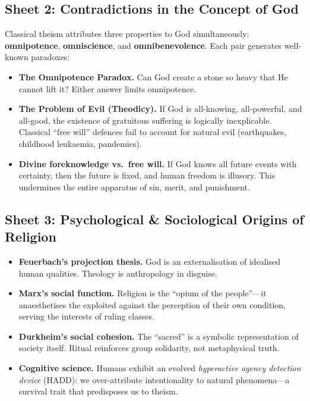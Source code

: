 \subsection{Sheet 2: Contradictions in the Concept of God}

Classical theism attributes three properties to God simultaneously:
\textbf{omnipotence}, \textbf{omniscience}, and \textbf{omnibenevolence}.
Each pair generates well-known paradoxes:

\begin{itemize}
  \item \textbf{The Omnipotence Paradox.}
    Can God create a stone so heavy that He cannot lift it?  Either answer
    limits omnipotence.
  \item \textbf{The Problem of Evil (Theodicy).}
    If God is all-knowing, all-powerful, and all-good, the existence of
    gratuitous suffering is logically inexplicable.  Classical ``free will''
    defences fail to account for natural evil
    (earthquakes, childhood leukaemia, pandemics).
  \item \textbf{Divine foreknowledge vs.\ free will.}
    If God knows all future events with certainty, then the future is fixed,
    and human freedom is illusory.  This undermines the entire apparatus of
    sin, merit, and punishment.
\end{itemize}

\subsection{Sheet 3: Psychological \& Sociological Origins of Religion}

\begin{itemize}
  \item \textbf{Feuerbach's projection thesis.}
    God is an externalisation of idealised human qualities.  Theology is
    anthropology in disguise.
  \item \textbf{Marx's social function.}
    Religion is the ``opium of the people''---it
    anaesthetises the exploited against the perception of their own condition,
    serving the interests of ruling classes.
  \item \textbf{Durkheim's social cohesion.}
    The ``sacred'' is a symbolic representation of society itself.  Ritual
    reinforces group solidarity, not metaphysical truth.
  \item \textbf{Cognitive science.}
    Humans exhibit an evolved \emph{hyperactive agency detection
    device} (HADD): we over-attribute intentionality to
    natural phenomena---a survival trait that predisposes us to theism.
\end{itemize}

